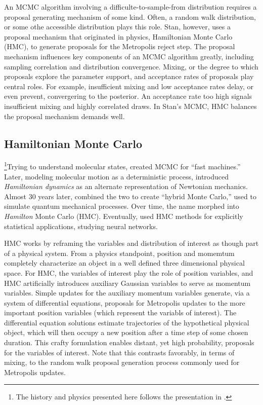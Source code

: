 An MCMC algorithm involving a difficulte-to-sample-from distribution requires a proposal generating mechanism of some kind. Often, a random walk distribution, or some othe accessible distribution plays this role. Stan, however, uses a proposal mechanism that originated in physics, Hamiltonian Monte Carlo (HMC), to generate proposals for the Metropolis reject step. The proposal mechanism influences key components of an MCMC algorithm greatly, including sampling correlation and distribution convergence. Mixing, or the degree to which proposals explore the parameter support, and acceptance rates of proposals play central roles. For example, insufficient mixing and low acceptance rates delay, or even prevent, convergering to the posterior. An acceptance rate too high signals insufficient mixing and highly correlated draws. In Stan's MCMC, HMC balances the proposal mechanism demands well.

\subsection{Hamiltonian Monte Carlo}%

\footnote{The history and physics presented here follows the presentation in \cite{Neal2011}.}Trying to understand molecular states, \cite{Metropolis1953} created MCMC for ``fast machines.'' Later, modeling molecular motion as a deterministic process, \cite{Alder1959} introduced {\it Hamiltonian dynamics} as an alternate representation of Newtonian mechanics. Almost 30 years later, \cite{Duane1987} combined the two to create ``hybrid Monte Carlo,'' used to simulate quantum mechanical processes. Over time, the name morphed into {\it Hamilton} Monte Carlo (HMC). Eventually, \cite{Neal1996} used HMC methods for explicitly statistical applications, studying neural networks.

HMC works by reframing the variables and distribution of interest as though part of a physical system. From a physics standpoint, position and momemtum completely characterize an object in a well defined three dimensional physical space. For HMC, the variables of interest play the role of position variables, and HMC artificially introduces auxiliary Gaussian variables to serve as momentum variables. Simple updates for the auxiliary momentum variables generate, via a system of differential equations, proposals for Metropolis updates to the more important position variables (which represent the variabls of interest). The differential equation solutions estimate trajectories of the hypothetical physical object, which will then occupy a new position after a time step of some chosen duration. This crafty formulation enables distant, yet high probability, proposals for the variables of interest. Note that this contrasts favorably, in terms of mixing, to the random walk proposal generation process commonly used for Metropolis updates.


